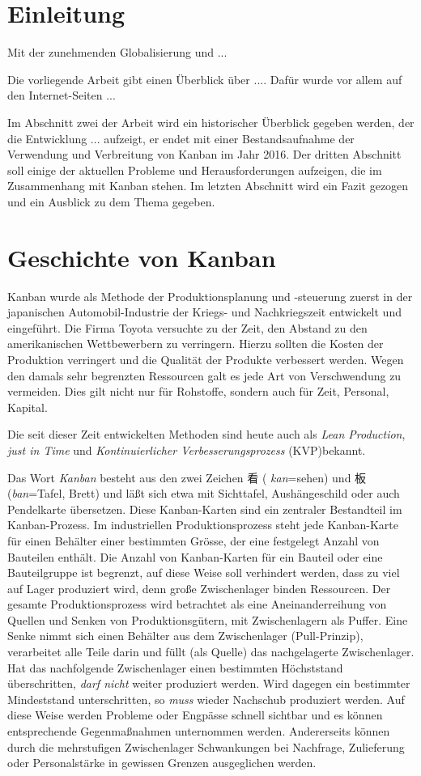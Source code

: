 \section{Einleitung}
Mit der zunehmenden Globalisierung und ...

Die vorliegende Arbeit gibt einen Überblick über ....
Dafür wurde vor allem auf den Internet-Seiten ...

Im Abschnitt zwei der Arbeit wird ein historischer Überblick gegeben 
werden, der die Entwicklung ... aufzeigt, er endet mit einer 
Bestandsaufnahme der Verwendung und Verbreitung von Kanban im Jahr 2016. 
Der dritten Abschnitt soll einige der aktuellen Probleme und 
Herausforderungen aufzeigen, die im Zusammenhang mit Kanban stehen. 
Im letzten Abschnitt wird ein Fazit gezogen und ein Ausblick zu dem Thema gegeben.

\section{Geschichte von Kanban}

Kanban wurde als Methode der Produktionsplanung und -steuerung zuerst in der japanischen Automobil-Industrie der Kriegs- und Nachkriegszeit entwickelt und eingeführt.
Die Firma Toyota versuchte zu der Zeit, den Abstand zu den amerikanischen Wettbewerbern zu verringern.
Hierzu sollten die Kosten der Produktion verringert und die Qualität der Produkte verbessert werden.
Wegen den damals sehr begrenzten Ressourcen galt es jede Art von Verschwendung zu vermeiden. Dies gilt nicht nur für Rohstoffe, sondern auch für Zeit, Personal, Kapital.

Die seit dieser Zeit entwickelten Methoden sind heute auch als \emph{Lean Production}, \emph{just in Time} und \emph{Kontinuierlicher Verbesserungsprozess} (KVP)bekannt.

Das Wort \emph{Kanban} besteht aus den zwei Zeichen {\CN 看} ( \emph{kan}=sehen) und {\CN 板} (\emph{ban}=Tafel, Brett) und läßt sich etwa mit Sichttafel, Aushängeschild oder auch Pendelkarte übersetzen.
Diese Kanban-Karten sind ein zentraler Bestandteil im Kanban-Prozess.
Im industriellen Produktionsprozess steht jede Kanban-Karte für einen Behälter einer bestimmten Grösse, der eine festgelegt Anzahl von Bauteilen enthält.
Die Anzahl von Kanban-Karten für ein Bauteil oder eine Bauteilgruppe ist begrenzt, auf diese Weise soll verhindert werden, dass zu viel auf Lager produziert wird, denn große Zwischenlager binden Ressourcen.
Der gesamte Produktionsprozess wird betrachtet als eine Aneinanderreihung von Quellen und Senken von Produktionsgütern, mit Zwischenlagern als Puffer.
Eine Senke nimmt sich einen Behälter aus dem Zwischenlager (Pull-Prinzip), verarbeitet alle Teile darin und füllt (als Quelle) das nachgelagerte Zwischenlager.
Hat das nachfolgende Zwischenlager einen bestimmten Höchststand überschritten, \emph{darf nicht} weiter produziert werden.
Wird dagegen ein bestimmter Mindeststand unterschritten, so \emph{muss} wieder Nachschub produziert werden.
Auf diese Weise werden Probleme oder Engpässe schnell sichtbar und es können entsprechende Gegenmaßnahmen unternommen werden.
Andererseits können durch die mehrstufigen Zwischenlager Schwankungen bei Nachfrage, Zulieferung oder Personalstärke in gewissen Grenzen ausgeglichen werden.

